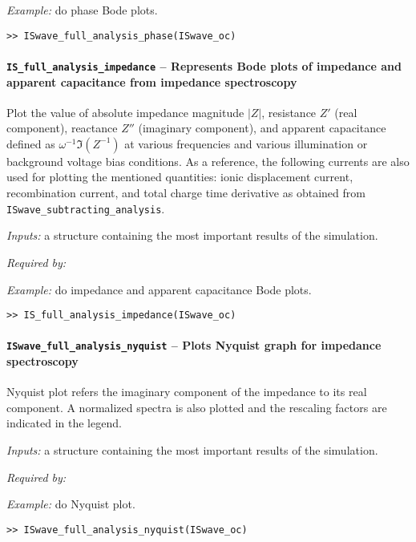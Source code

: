 				
				\textit{Example:} do phase Bode plots.
				\begin{lstlisting}[style=Matlab-editor]
>> ISwave_full_analysis_phase(ISwave_oc)
				\end{lstlisting}
				
\paragraph{\texttt{IS\_full\_analysis\_impedance} -- Represents Bode plots of impedance and apparent capacitance from impedance spectroscopy}
Plot the value of absolute impedance magnitude $|Z|$, resistance $Z'$ (real component), reactance $Z''$ (imaginary component), and apparent capacitance defined as $\omega^{-1}\Im(Z^{-1})$ at various frequencies and various illumination or background voltage bias conditions.
As a reference, the following currents are also used for plotting the mentioned quantities: ionic displacement current, recombination current, and total charge time derivative as obtained from \texttt{ISwave\_subtracting\_analysis}.

\textit{Inputs:} a structure containing the most important results of the simulation.



\textit{Required by:} 

\textit{Example:} do impedance and apparent capacitance Bode plots.
\begin{lstlisting}[style=Matlab-editor]
>> IS_full_analysis_impedance(ISwave_oc)
\end{lstlisting}

\paragraph{\texttt{ISwave\_full\_analysis\_nyquist} -- Plots Nyquist graph for impedance spectroscopy}
Nyquist plot refers the imaginary component of the impedance to its real component.
A normalized spectra is also plotted and the rescaling factors are indicated in the legend.

\textit{Inputs:} a structure containing the most important results of the simulation.



\textit{Required by:} 

\textit{Example:} do Nyquist plot.
\begin{lstlisting}[style=Matlab-editor]
>> ISwave_full_analysis_nyquist(ISwave_oc)
\end{lstlisting}

